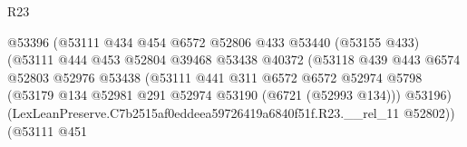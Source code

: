 \begin{lexlean}{R23}
\begin{coremodule}
                                                @53396
                                                (@53111
                                                  @434
                                                  @454
                                                  @6572
                                                  @52806
                                                  @433
                                                  @53440
                                                  (@53155 @433)
                                                  (@53111
                                                    @444
                                                    @453
                                                    @52804
                                                    @39468
                                                    @53438
                                                    @40372
                                                    (@53118
                                                      @439
                                                      @443
                                                      @6574
                                                      @52803
                                                      @52976
                                                      @53438
                                                      (@53111
                                                        @441
                                                        @311
                                                        @6572
                                                        @6572
                                                        @52974
                                                        @5798
                                                        (@53179
                                                          @134
                                                          @52981
                                                          @291
                                                          @52974
                                                          @53190
                                                          (@6721 (@52993 @134)))
                                                        @53196)
                                                      (LexLeanPreserve.C7b2515af0eddeea59726419a6840f51f.R23.__rel_11
                                                        @52802))
                                                    (@53111
                                                      @451

\end{coremodule}
\end{lexlean}

